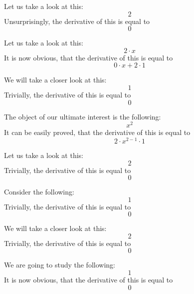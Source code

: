 \documentclass{article}
\begin{document}
Let us take a look at this:
\begin{equation}
2 
\end{equation}
Unsurprisingly, the derivative of this is equal to
\begin{equation}
0 
\end{equation}

Let us take a look at this:
\begin{equation}
2 \cdot x 
\end{equation}
It is now obvious, that the derivative of this is equal to
\begin{equation}
0 \cdot x + 2 \cdot 1 
\end{equation}

We will take a closer look at this:
\begin{equation}
1 
\end{equation}
Trivially, the derivative of this is equal to
\begin{equation}
0 
\end{equation}

The object of our ultimate interest is the following:
\begin{equation}
x ^{2 } 
\end{equation}
It can be easily proved, that the derivative of this is equal to
\begin{equation}
2 \cdot x ^{2 - 1 } \cdot 1 
\end{equation}

Let us take a look at this:
\begin{equation}
2 
\end{equation}
Trivially, the derivative of this is equal to
\begin{equation}
0 
\end{equation}

Consider the following:
\begin{equation}
1 
\end{equation}
Trivially, the derivative of this is equal to
\begin{equation}
0 
\end{equation}

We will take a closer look at this:
\begin{equation}
2 
\end{equation}
Trivially, the derivative of this is equal to
\begin{equation}
0 
\end{equation}

We are going to study the following:
\begin{equation}
1 
\end{equation}
It is now obvious, that the derivative of this is equal to
\begin{equation}
0 
\end{equation}
\end{document}
